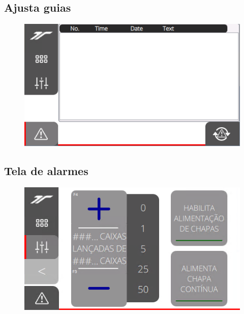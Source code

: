 \subsection{\small Ajusta guias}
\begin{figure}
    \centering
    \includegraphics{src/imagesICV/11-KTP400-Feeder/9.png}
\end{figure}

\newpage
\thispagestyle{fancy}
\vspace{\fill}
\subsection{\small Tela de alarmes}
\begin{figure}
    \centering
    \includegraphics{src/imagesICV/11-KTP400-Feeder/10.png}
\end{figure}
